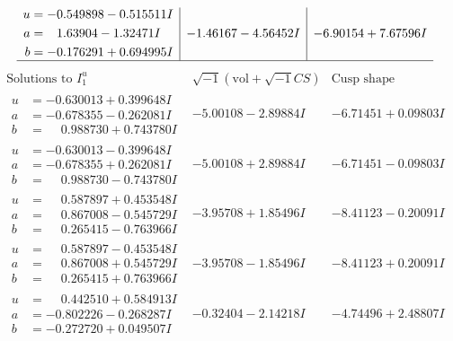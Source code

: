 \documentclass[1p]{elsarticle_modified}
\theoremstyle{definition}
\newcommand{\I}{\sqrt{-1}}
\begin{document}
$$\begin{array}{c|c|c}
\begin{aligned}
u &= -0.549898 - 0.515511 I \\
a &= \phantom{-}1.63904 - 1.32471 I \\
b &= -0.176291 + 0.694995 I\end{aligned}
 & -1.46167 - 4.56452 I & -6.90154 + 7.67596 I\\
 \hline 
 \end{array}$$\newpage$$\begin{array}{c|c|c}  
\text{Solutions to }I^u_{1}& \I (\text{vol} + \sqrt{-1}CS) & \text{Cusp shape}\\
 \hline 
\begin{aligned}
u &= -0.630013 + 0.399648 I \\
a &= -0.678355 - 0.262081 I \\
b &= \phantom{-}0.988730 + 0.743780 I\end{aligned}
 & -5.00108 - 2.89884 I & -6.71451 + 0.09803 I \\ \hline\begin{aligned}
u &= -0.630013 - 0.399648 I \\
a &= -0.678355 + 0.262081 I \\
b &= \phantom{-}0.988730 - 0.743780 I\end{aligned}
 & -5.00108 + 2.89884 I & -6.71451 - 0.09803 I \\ \hline\begin{aligned}
u &= \phantom{-}0.587897 + 0.453548 I \\
a &= \phantom{-}0.867008 - 0.545729 I \\
b &= \phantom{-}0.265415 - 0.763966 I\end{aligned}
 & -3.95708 + 1.85496 I & -8.41123 - 0.20091 I \\ \hline\begin{aligned}
u &= \phantom{-}0.587897 - 0.453548 I \\
a &= \phantom{-}0.867008 + 0.545729 I \\
b &= \phantom{-}0.265415 + 0.763966 I\end{aligned}
 & -3.95708 - 1.85496 I & -8.41123 + 0.20091 I \\ \hline\begin{aligned}
u &= \phantom{-}0.442510 + 0.584913 I \\
a &= -0.802226 - 0.268287 I \\
b &= -0.272720 + 0.049507 I\end{aligned}
 & -0.32404 - 2.14218 I & -4.74496 + 2.48807 I \\ \hline\begin{aligned}

\end{aligned}
\end{array}$$
\end{document}
